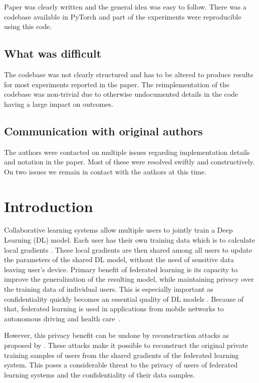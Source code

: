 Paper was clearly written and the general idea was easy to follow. There was a codebase available in PyTorch and part of the experiments were reproducible using this code.

\subsection{What was difficult}

The codebase was not clearly structured and has to be altered to produce results for most experiments reported in the paper. The reimplementation of the codebase was non-trivial due to otherwise undocumented details in the code having a large impact on outcomes.

\subsection*{Communication with original authors}

The authors were contacted on multiple issues regarding implementation details and notation in the paper. Most of these were resolved swiftly and constructively. On two issues we remain in contact with the authors at this time. 

\newpage


\section{Introduction}
\label{sec:intro}

Collaborative learning systems allow multiple users to jointly train a Deep Learning (DL) model. Each user has their own training data which is to calculate local gradients \cite{yang2019federated}\cite{guo2020towards}\cite{melis2019exploiting}. These local gradients are then shared among all users to update the parameters of the shared DL model, without the need of sensitive data leaving user's device. Primary benefit of federated learning is its capacity to improve the generalization of the resulting model, while maintaining privacy over the training data of individual users. This is especially important as confidentiality quickly becomes an essential quality of DL models \cite{abadi2016deep}. Because of that, federated learning is used in applications from mobile networks \cite{kang2019} to autonomous driving \cite{niknam2020federated} and health care~\cite{brisimi2018federated}.

However, this privacy benefit can be undone by reconstruction attacks as proposed by \cite{geiping2020inverting}\cite{zhao2020idlg}\cite{zhu2019}. These attacks make it possible to reconstruct the original private training samples of users from the shared gradients of the federated learning system. This poses a considerable threat to the privacy of users of federated learning systems and the confidentiality of their data samples.

